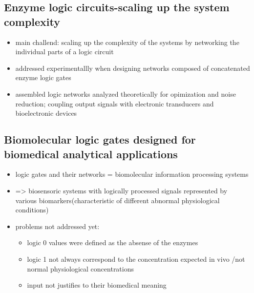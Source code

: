 \documentclass[12pt]{article}
\begin{document}
\subsection{Enzyme logic circuits-scaling up the system complexity}
\begin{itemize}
	\item main challend: scaling up the complexity of the systems by networking the individual parts of a logic circuit 
	\item addressed experimentallly when designing networks composed of concatenated enzyme logic gates
	\item assembled logic networks analyzed theoretically for opimization and noise reduction; coupling output signals with electronic transducers and bioelectronic devices
\end{itemize}
\subsection{Biomolecular logic gates designed for biomedical analytical applications}
\begin{itemize}
	\item logic gates and their networks = biomolecular information processing systems 
	\item => biosensoric systems with logically processed signals represented by various biomarkers(characteristic of different abnormal physiological conditions)
	\item problems not addressed yet:
	\begin{itemize}
		\item logic 0 values were defined as the absense of the enzymes
		\item logic 1 not always correspond to the concentration expected in vivo /not normal physiological concentrations 
		\item input not justifies to their biomedical meaning
	
	\end{itemize}
\end{itemize}
\end{document}
